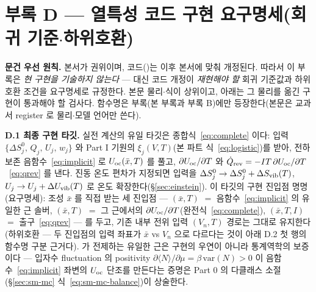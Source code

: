 \section*{부록 D --- 열특성 코드 구현 요구명세(회귀 기준$\cdot$하위호환)}
\label{sec:codemap-thermal}

\textbf{문건 우선 원칙.} 본서가 권위이며, 코드()는 이후 본서에 맞춰 개정된다. 따라서 이
부록은 \emph{현 구현을 기술하지 않는다} --- 대신 코드 개정이 \emph{재현해야 할} 회귀 기준값과 하위호환 조건을
요구명세로 규정한다. 본문 물리$\cdot$식이 상위이고, 아래는 그 물리를 옮긴 구현이 통과해야 할 검사다. 함수명은
부록(본 부록과 부록 B)에만 등장한다(본문은 교과서 register 로 물리$\cdot$모델 언어만 쓴다).

\textbf{D.1 최종 구현 타깃.} 실전 계산의 유일 타깃은 종합식~\eqref{eq:complete} 이다: 입력
$\{\Delta S^0_j,\,Q_j,\,U_j,\,w_j\}$ 와 Part I 기원의 $\xi_j(V,T)$(본 파트 식~\eqref{eq:logistic})를 받아, 전하 보존
음함수~\eqref{eq:implicit} 로 $U_{\mathrm{oc}}(\bar x,T)$ 를 풀고, $\partial U_{\mathrm{oc}}/\partial T$ 와 $\dot Q_{\mathrm{rev}}=-IT\,\partial
U_{\mathrm{oc}}/\partial T$~\eqref{eq:qrev} 를 낸다. 진동 온도 편차가 지정되면 입력을 $\Delta S^0_j\to\Delta
S^0_j+\Delta S_{\mathrm{vib}}(T)$, $U_j\to U_j+\Delta U_{\mathrm{vib}}(T)$ 로 온도 확장한다(\S\ref{sec:einstein}).
이 타깃의 구현 진입점 명명(요구명세): 조성 $\bar x$ 를 직접 받는 세 진입점 ---
$(\bar x,T)$ $=$ 음함수~\eqref{eq:implicit} 의 유일한 근 솔버,
$(\bar x,T)$ $=$ 그 근에서의 $\partial U_{\mathrm{oc}}/\partial T$(완전식~\eqref{eq:complete}),
$(\bar x,T,I)$ $=$ 출구~\eqref{eq:qrev} --- 를 두고, 기존 내부 전위 입력
$(V_n,T)$ 경로는 그대로 유지한다(하위호환 --- 두 진입점의 입력 좌표가
$\bar x$ vs $V_n$ 으로 다르다는 것이 아래 D.2 첫 행의 함수명 구분 근거다).  가 전제하는
유일한 근은 구현의 우연이 아니라 통계역학의 보증이다 --- 입자수 fluctuation 의 positivity
$\partial\langle N\rangle/\partial\mu=\beta\,\mathrm{var}(N)>0$ 이 음함수~\eqref{eq:implicit} 좌변의 $U_{\mathrm{oc}}$
단조를 만든다는 증명은 Part 0 의 다클래스 소절(\S\ref{sec:sm-mc} 식~\eqref{eq:sm-mc-balance})이 상술한다.

